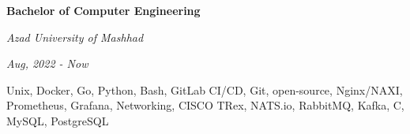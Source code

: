 \documentclass{engineercv}
\begin{document}
\begin{minipage}{\textwidth}
  \begin{multicols}{2}
    \begin{minipage}{0.5\textwidth}
      \textbf{Bachelor of Computer Engineering}

      \textit{Azad University of Mashhad}

      \textit{Aug, 2022 - Now}
    \end{minipage}
    \columnbreak
    \begin{minipage}{0.5\textwidth}
      Unix, Docker, Go, Python, Bash, GitLab CI/CD, Git, open-source,
      Nginx/NAXI, Prometheus, Grafana, Networking, CISCO TRex,
      NATS.io, RabbitMQ, Kafka, C, MySQL, PostgreSQL
    \end{minipage}
  \end{multicols}
\end{minipage}
\end{document}
